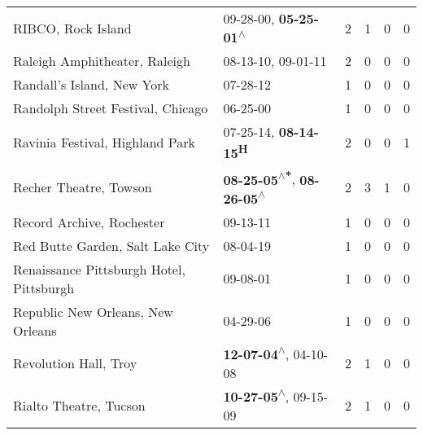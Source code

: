 \begin{supertabular}{p{0.4\textwidth}p{0.3\textwidth}p{0.05\textwidth}p{0.05\textwidth}p{0.05\textwidth}p{0.05\textwidth}}
                                                           RIBCO, Rock Island &                     09-28-00\textsuperscript{}, \textbf{05-25-01\textsuperscript{$\wedge$}} &  2 &  1 &  0 &  0 \\
                                                Raleigh Amphitheater, Raleigh &                                      08-13-10\textsuperscript{}, 09-01-11\textsuperscript{} &  2 &  0 &  0 &  0 \\
                                                   Randall's Island, New York &                                                                  07-28-12\textsuperscript{} &  1 &  0 &  0 &  0 \\
                                            Randolph Street Festival, Chicago &                                                                  06-25-00\textsuperscript{} &  1 &  0 &  0 &  0 \\
                                              Ravinia Festival, Highland Park &                            07-25-14\textsuperscript{}, \textbf{08-14-15\textsuperscript{H}} &  2 &  0 &  0 &  1 \\
                                                       Recher Theatre, Towson &   \textbf{08-25-05\textsuperscript{$\wedge$*}}, \textbf{08-26-05\textsuperscript{$\wedge$}} &  2 &  3 &  1 &  0 \\
                                                    Record Archive, Rochester &                                                                  09-13-11\textsuperscript{} &  1 &  0 &  0 &  0 \\
                                             Red Butte Garden, Salt Lake City &                                                                  08-04-19\textsuperscript{} &  1 &  0 &  0 &  0 \\
                                     Renaissance Pittsburgh Hotel, Pittsburgh &                                                                  09-08-01\textsuperscript{} &  1 &  0 &  0 &  0 \\
                                            Republic New Orleans, New Orleans &                                                                  04-29-06\textsuperscript{} &  1 &  0 &  0 &  0 \\
                                                        Revolution Hall, Troy &                     \textbf{12-07-04\textsuperscript{$\wedge$}}, 04-10-08\textsuperscript{} &  2 &  1 &  0 &  0 \\
                                                       Rialto Theatre, Tucson &                     \textbf{10-27-05\textsuperscript{$\wedge$}}, 09-15-09\textsuperscript{} &  2 &  1 &  0 &  0 \\

\end{supertabular}
